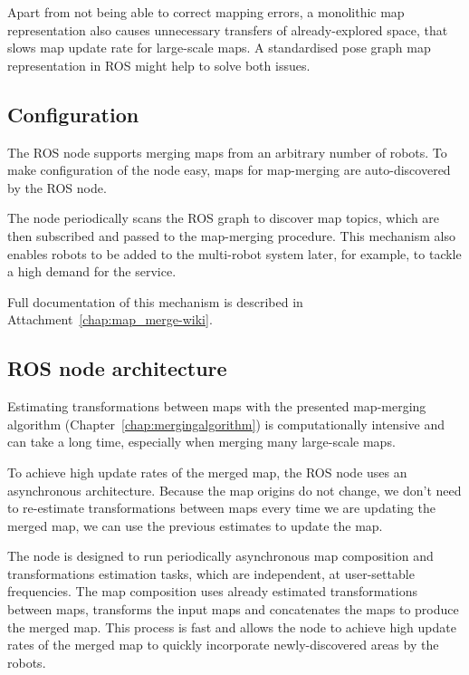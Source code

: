 Apart from not being able to correct mapping errors, a monolithic map representation also causes unnecessary transfers of already-explored space, that slows map update rate for large-scale maps. A standardised pose graph map representation in \gls{ROS} might help to solve both issues.


\subsection{Configuration}
\label{sec:configuration}

The \gls{ROS} node supports merging maps from an arbitrary number of robots. To make configuration of the node easy, maps for map-merging are auto-discovered by the \gls{ROS} node.

The node periodically scans the \gls{ROS} graph to discover map topics, which are then subscribed and passed to the map-merging procedure. This mechanism also enables robots to be added to the multi-robot system later, for example, to tackle a high demand for the service.

Full documentation of this mechanism is described in Attachment~\ref{chap:map_merge-wiki}.

\subsection{ROS node architecture}
\label{sec:node-architecture}

Estimating transformations between maps with the presented map-merging algorithm (Chapter~\ref{chap:mergingalgorithm}) is computationally intensive and can take a long time, especially when merging many large-scale maps.

To achieve high update rates of the merged map, the \gls{ROS} node uses an asynchronous architecture. Because the map origins do not change, we don't need to re-estimate transformations between maps every time we are updating the merged map, we can use the previous estimates to update the map.

The node is designed to run periodically asynchronous map composition and transformations estimation tasks, which are independent, at user-settable frequencies. The map composition uses already estimated transformations between maps, transforms the input maps and concatenates the maps to produce the merged map. This process is fast and allows the node to achieve high update rates of the merged map to quickly incorporate newly-discovered areas by the robots.

